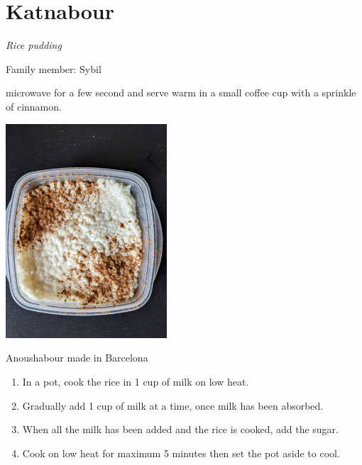 \chapter{Katnabour}
\label{ch:katnabour}
\textit{Rice pudding}

Family member: Sybil


 microwave for a few second and serve warm in a small coffee cup with a sprinkle of cinnamon.

\begin{marginfigure}
  \includegraphics[width=60mm]{dermardiros/images/Rice pudding.jpg}
  \caption{Anoushabour made in Barcelona}
\end{marginfigure}


\begin{enumerate}
    \item In a pot, cook the rice in 1 cup of milk on low heat.
    \item Gradually add 1 cup of milk at a time, once milk has been absorbed.
    \item When all the milk has been added and the rice is cooked, add the sugar. 
    \item Cook on low heat for maximum 5 minutes then set the pot aside to cool.
\end{enumerate}

